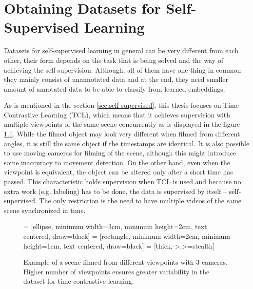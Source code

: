 \chapter{\label{chap:dataset}Obtaining Datasets for Self-Supervised Learning}

Datasets for self-supervised learning in general can be very different from each other, their form depends on the task that is being solved and the way of achieving the self-supervision. Although, all of them have one thing in common -- they mainly consist of unannotated data and at the end, they need smaller amount of annotated data to be able to classify from learned embeddings.

As is mentioned in the section \ref{sec:self-supervised}, this thesis focuses on Time-Contrastive Learning (TCL), which means that it achieves supervision with multiple viewpoints of the same scene concurrently as is displayed in the figure \ref{fig:scene-multiple-cameras}. While the filmed object may look very different when filmed from different angles, it is still the same object if the timestamps are identical. It is also possible to use moving cameras for filming of the scene, although this might introduce some inaccuracy to movement detection. On the other hand, even when the viewpoint is equivalent, the object can be altered only after a short time has passed. This characteristic holds supervision when TCL is used and because no extra work (e.g. labeling) has to be done, the data is supervised by itself -- self-supervised. The only restriction is the need to have multiple videos of the same scene synchronized in time.

\begin{figure}[ht!]
    \centering

     = [ellipse, minimum width=3cm, minimum height=2cm, text centered, draw=black]
     = [rectangle, minimum width=2cm, minimum height=1cm, text centered, draw=black]
     = [thick,->,>=stealth]

    
    \caption{Example of a scene filmed from different viewpoints with 3 cameras. Higher number of viewpoints ensures greater variability in the dataset for time-contrastive learning.}
    \label{fig:scene-multiple-cameras}
\end{figure}

